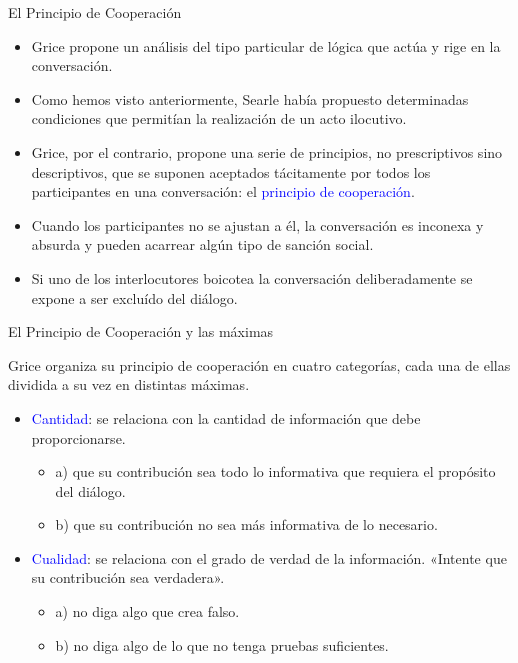 \documentclass{beamer}
\begin{document}
\begin{frame}{El Principio de Cooperación}

\begin{itemize}
	\item Grice propone un análisis del tipo particular de lógica que actúa y rige en la conversación.
	\item Como hemos visto anteriormente, Searle había propuesto determinadas condiciones que permitían la realización de un acto ilocutivo. 
	\item Grice, por el contrario, propone una serie de principios, no prescriptivos sino descriptivos, que se suponen aceptados tácitamente por todos los participantes en una conversación: el \textcolor{blue}{principio de cooperación}.
	\item Cuando los participantes no se ajustan a él, la conversación es inconexa y absurda y pueden acarrear algún tipo de sanción social.
	\item Si uno de los interlocutores boicotea la conversación deliberadamente se expone a ser excluído del diálogo.
\end{itemize}

\end{frame}

\begin{frame}{El Principio de Cooperación y las máximas}

	Grice organiza su principio de cooperación en cuatro categorías, cada una de ellas dividida a su vez en distintas máximas.
	
\begin{itemize}
	\item \textcolor{blue}{Cantidad}: se relaciona con la cantidad de información que debe proporcionarse.
	\begin{itemize}
		\item a) que su contribución sea todo lo informativa que requiera el propósito del diálogo.
		\item b) que su contribución no sea más informativa de lo necesario.
	\end{itemize}

	\vspace{0.3cm}
	
	\item \textcolor{blue}{Cualidad}: se relaciona con el grado de verdad de la información. «Intente que su contribución sea verdadera».
	\begin{itemize}
		\item a) no diga algo que crea falso.
		\item b) no diga algo de lo que no tenga pruebas suficientes.
	\end{itemize}

\end{itemize}

\end{frame}
\end{document}
